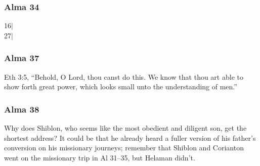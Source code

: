 	\subsubsection{Alma 34} %
	
		\begin{description}
		
		\item[16$\vert$]
		
		\item[27$\vert$]
		
		\end{description}
		
	\subsubsection{Alma 37} %
	
		\begin{compactdesc}
		
		\item[6$\vert$]
		\begin{compactdesc}
		\item[small means...doth confound the wise] Eth 3:5, ``Behold, O Lord, thou canst do this. We know that thou art able to show forth great power, which looks small unto the understanding of men.''
		\end{compactdesc}
		
		\end{compactdesc}
		
	\subsubsection{Alma 38} %
	
		Why does Shiblon, who seems like the most obedient and diligent son, get the shortest address? It could be that he already heard a fuller version of his father's conversion on his missionary journeys; remember that Shiblon and Corianton went on the missionary trip in Al 31--35, but Helaman didn't.
		
